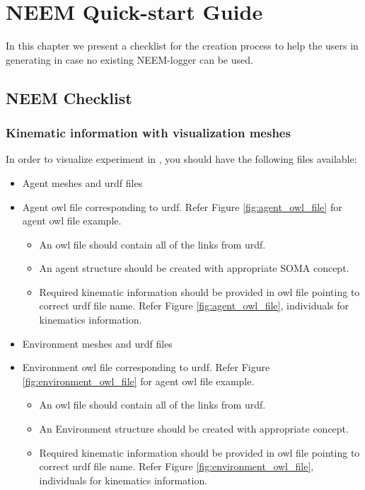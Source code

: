 \chapter{NEEM Quick-start Guide}
\label{ch:initial_checklist}

In this chapter we present a checklist for the \neems creation process to help the users in generating \neems in case no existing NEEM-logger can be used. 

\section{NEEM Checklist}

\subsection{Kinematic information with visualization meshes}
\label{sec:checklist_files}

In order to visualize \neem experiment in \openease, you should have the following files available:

\begin{itemize}
	\item Agent meshes and urdf files
	\item Agent owl file corresponding to urdf. Refer Figure \ref{fig:agent_owl_file} for agent owl file example.
	\begin{itemize}
		\item An owl file should contain all of the links from urdf.
		\item An agent structure should be created with appropriate SOMA concept. 
		\item Required kinematic information should be provided in owl file pointing to correct urdf file name. Refer Figure \ref{fig:agent_owl_file}, individuals for kinematics information. 
	\end{itemize}
	\item Environment meshes and urdf files
	\item Environment owl file corresponding to urdf. Refer Figure \ref{fig:environment_owl_file} for agent owl file example.
	\begin{itemize}
		\item An owl file should contain all of the links from urdf.
		\item An Environment structure should be created with appropriate \soma concept.
		\item Required kinematic information should be provided in owl file pointing to correct urdf file name. Refer Figure \ref{fig:environment_owl_file}, individuals for kinematics information.
	\end{itemize}
\end{itemize}

